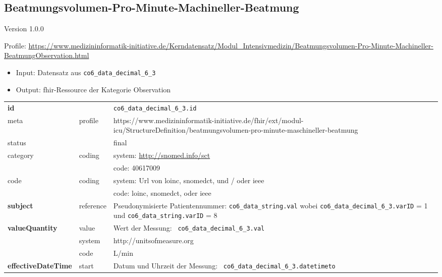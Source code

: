 \subsection{Beatmungsvolumen-Pro-Minute-Machineller-Beatmung} 
\noindent Version 1.0.0

\noindent Profile: \url{https://www.medizininformatik-initiative.de/Kerndatensatz/Modul_Intensivmedizin/Beatmungsvolumen-Pro-Minute-Machineller-BeatmungObservation.html}

\begin{itemize}
\item Input: Datensatz aus \texttt{co6\_data\_decimal\_6\_3}
\item Output: \ac{fhir}-Ressource der Kategorie \glqq Observation\grqq{}
\end{itemize}

\newpage

\begin{longtable}{|l|l|p{7.5cm}|}
        \hline
        \rowcolor{lightgray} \multicolumn{3}{|l|}{Data Mapping (inhaltlich)} \\ \hline
        \textbf{id} &  & \texttt{co6\_data\_decimal\_6\_3.id} \\ \hline
	meta & profile & https://www.medizininformatik-initiative.de/fhir/ext/modul-icu/StructureDefinition/beatmungsvolumen-pro-minute-maschineller-beatmung \\ \hline 
	status &  & final   \\ \hline 
	category & coding & system: \url{http://snomed.info/sct} \\
\cline{3-3}
	& & code: 40617009 \\ \hline
	code & coding & system: Url von \ac{loinc}, \ac{snomedct}, und / oder \ac{ieee} \\ 
	\cline{3-3} 
	 &  & code: \ac{loinc}, \ac{snomedct}, oder \ac{ieee} \\ \hline
	\textbf{subject} & reference & Pseudonymisierte Patientennummer: \texttt{co6\_data\_string.val} wobei \texttt{co6\_data\_decimal\_6\_3.varID} = 1 und \texttt{co6\_data\_string.varID} = 8 \\ \hline
	 \textbf{valueQuantity}  & value & Wert der Messung: \texttt{
co6\_data\_decimal\_6\_3.val} \\
        \cline{2-3}
         & system & http://unitsofmeasure.org \\
         \cline{2-3}
         & code &
L/min
\\ \hline
     \textbf{effectiveDateTime}  & start & Datum und Uhrzeit der Messung: \texttt{
co6\_data\_decimal\_6\_3.datetimeto} \\
     \hline
\end{longtable}


